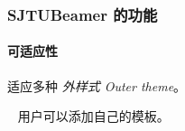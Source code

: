 \documentclass{ctexbeamer}
\begin{document}
\begin{frame}
  \frametitle{SJTUBeamer 的功能}

  \paragraph{可适应性} 适应多种
  \emph{外样式 Outer theme}。

  ~
  用户可以添加自己的\alert{模板}。
\end{frame}
\end{document}
